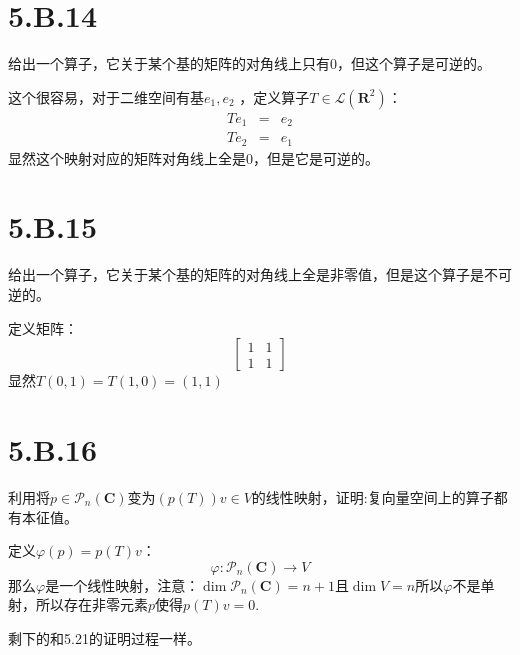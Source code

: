 \documentclass[10pt,a4paper,UTF8]{article}
\begin{document}
\section{5.B.14}
\label{sec:org1ef4380}


\begin{problem}
给出一个算子，它关于某个基的矩阵的对角线上只有\(0\)，但这个算子是可逆的。
\end{problem}

\begin{answer}
这个很容易，对于二维空间有基\(e_{1},e_{2}\) ，定义算子\(T\in \mathcal{L}(\mathbf{R}^{2})\)：
\begin{eqnarray}
\label{eq:12}
Te_{1}&=&e_{2} \\
Te_{2}&=&e_{1}
\end{eqnarray}
显然这个映射对应的矩阵对角线上全是\(0\)，但是它是可逆的。
\end{answer}
\section{5.B.15}
\label{sec:org46cfd36}


\begin{problem}
给出一个算子，它关于某个基的矩阵的对角线上全是非零值，但是这个算子是不可逆的。
\end{problem}

\begin{answer}
定义矩阵：
\begin{equation}
\label{eq:13}
\begin{bmatrix}
1 & 1 \\
1 & 1
\end{bmatrix}
\end{equation}
显然\(T(0,1) = T(1,0) = (1,1)\)
\end{answer}
\section{5.B.16}
\label{sec:orgba79912}


\begin{problem}
利用将\(p\in \mathcal{P}_{n}(\mathbf{C})\)变为\((p(T)) v\in V\)的线性映射，证明:复向量空间上的算子都有本征值。
\end{problem}

\begin{answer}
定义\(\varphi(p) = p(T)v\)：
\begin{equation}
\label{eq:14}
\varphi: \mathcal{P}_{n}(\mathbf{C}) \rightarrow V
\end{equation}
那么\(\varphi\)是一个线性映射，注意：\(\dim \mathcal{P}_{n}(\mathbf{C}) = n+1\)且\(\dim V = n\)所以\(\varphi\)不是单射，所以存在非零元素\(p\)使得\(p(T)v = 0\).

剩下的和5.21的证明过程一样。
\end{answer}
\end{document}
